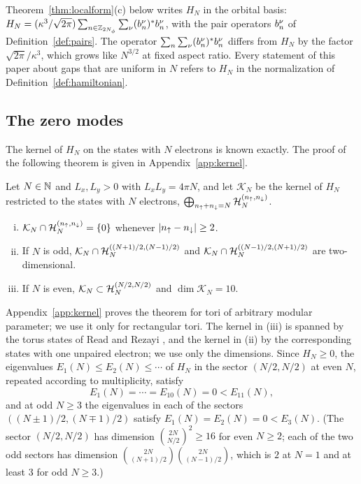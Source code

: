 \begin{remark}\label{rem:orbitalform}
Theorem~\ref{thm:localform}(c) below writes $H_N$ in the orbital basis:
$H_N=(\kappa^3/\sqrt{2\pi})\sum_{n\in\mathbb{Z}_{2N_{\phi}}}\sum_\nu(b^{\nu}_{n})^*b^{\nu}_{n}$, with the pair operators
$b^{\nu}_{n}$ of Definition~\ref{def:pairs}. The operator $\sum_n\sum_\nu(b^{\nu}_{n})^*b^{\nu}_{n}$ differs from
$H_N$ by the factor $\sqrt{2\pi}/\kappa^3$, which grows like $N^{3/2}$ at fixed aspect ratio. Every statement
of this paper about gaps that are uniform in $N$ refers to $H_N$ in the normalization of
Definition~\ref{def:hamiltonian}.
\end{remark}

\subsection{The zero modes}

The kernel of $H_N$ on the states with $N$ electrons is known exactly. The proof of the following theorem is given in
Appendix~\ref{app:kernel}.

\begin{theorem}\label{thm:kernel}
Let $N\in\mathbb{N}$ and $L_x,L_y>0$ with $L_xL_y=4\pi N$, and let $\mathcal K_N$ be the kernel of $H_N$ restricted to
the states with $N$ electrons, $\bigoplus_{n_{\uparrow}+n_{\downarrow}=N}\mathcal{H}_N^{(n_{\uparrow},n_{\downarrow})}$.
\begin{enumerate}[(i)]
\item $\mathcal K_N\cap\mathcal{H}_N^{(n_{\uparrow},n_{\downarrow})}=\{0\}$ whenever $\lvert n_{\uparrow}-n_{\downarrow}\rvert\ge2$.
\item If $N$ is odd, $\mathcal K_N\cap\mathcal{H}_N^{((N+1)/2,(N-1)/2)}$ and $\mathcal K_N\cap\mathcal{H}_N^{((N-1)/2,(N+1)/2)}$ are
two-dimensional.
\item If $N$ is even, $\mathcal K_N\subset\mathcal{H}_N^{(N/2,N/2)}$ and $\dim\mathcal K_N=10$.
\end{enumerate}
\end{theorem}

Appendix~\ref{app:kernel} proves the theorem for tori of arbitrary modular parameter; we use it only for rectangular
tori. The kernel in (iii) is spanned by the torus states of Read and Rezayi \cite[Section~V]{RR96}, and the
kernel in (ii) by the corresponding states with one unpaired electron; we use only the dimensions. Since
$H_N\ge0$, the eigenvalues $E_1(N)\le E_2(N)\le\cdots$ of $H_N$ in the sector $(N/2,N/2)$ at even $N$,
repeated according to multiplicity, satisfy
\begin{equation}\label{eq:E11}
E_1(N)=\cdots=E_{10}(N)=0<E_{11}(N),
\end{equation}
and at odd $N\ge3$ the eigenvalues in each of the sectors $((N\pm1)/2,(N\mp1)/2)$ satisfy $E_1(N)=E_2(N)=0<E_3(N)$.
(The sector $(N/2,N/2)$ has dimension $\binom{2N}{N/2}^2\ge16$ for even $N\ge2$; each of the two odd sectors has
dimension $\binom{2N}{(N+1)/2}\binom{2N}{(N-1)/2}$, which is $2$ at $N=1$ and at least $3$ for odd $N\ge3$.)

